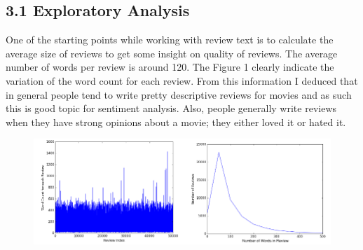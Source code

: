 \documentclass[11pt]{article}
\begin{document}
\subsection*{3.1 Exploratory Analysis}
\hspace{1.5em}One of the starting points while working with review text is to calculate the average size of reviews to get some insight on quality of reviews.  The average number of words per review is around 120. The Figure 1 clearly indicate the variation of the word count for each review. From this information I deduced that in general people tend to write pretty descriptive reviews for movies and as such this is  good topic for sentiment analysis. Also, people generally write reviews when they have strong opinions about a movie; they either loved it or hated it.
\begin{figure}[h!]
  \centering
    \includegraphics[width=1.2\linewidth]{1.png}
    \caption{}
\end{figure}
\end{document}
